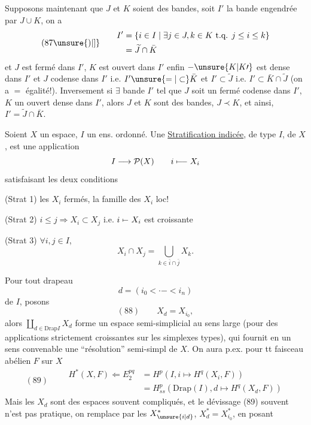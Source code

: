 Supposons maintenant que $J$ et $K$ soient des bandes,  soit $I'$ la bande engendrée par $J\cup K$, on a
\[
(87\unsure{)|]}\qquad\begin{aligned}
I'&=\{i\in I\mid\exists j\in J,k\in K\text{ t.q. }j\leq i\leq k\}\\
&=\widetilde J\cap\bar K
\end{aligned}
\]
et $J$ est fermé dans $I'$, $K$ est ouvert dans $I'$ enfin  $-\unsure{K|K\prime}$ est dense dans $I'$ et $J$ codense dans $I'$ i.e. $I'\unsure{=|\subset}\bar K$ et $I'\subset\widetilde J$  i.e. $I'\subset\bar K\cap\widetilde J$ (on a $=$ égalité!). Inversement si $\exists$ bande $I'$ tel que $J$ soit un fermé codense dans $I'$, $K$ un ouvert dense dans $I'$, alors $J$ et $K$ sont des bandes, $J\prec K$, et ainsi, $I'=\widetilde J\cap\bar K$.


Soient $X$ un espace, $I$ un ens. ordonné.
Une \uline{Stratification indicée}, de type $I$, de $X$, est une application
\[I\longrightarrow\mathcal P(X)\qquad i\mathrel{\mapstochar\relbar\joinrel\relbar}X_i\]
satisfaisant les deux conditions

(Strat 1) les $X_i$ fermés, la famille des $X_i$  loc! 

(Strat 2) $i\leq j\Longrightarrow X_i\subset X_j$ i.e. $i\mathrel{\mapstochar\relbar}X_i$ est croissante

(Strat 3) $\forall i,j\in I$, 
\[X_i\cap X_j=\bigcup_{k\in\bar i\cap\bar j}X_k.\]

Pour tout drapeau
\[d=(i_0<\mathord{\cdot}\mathord{-}<i_n)\]
de $I$, posons
\[(88)\qquad X_d=X_{i_0},\]
alors  $\coprod_{d\in\mathrm{Drap}I}X_d$ forme un  espace semi-simplicial  au sens large (pour des applications strictement croissantes sur les simplexes types), qui fournit en un sens convenable une ``résolution'' semi-simpl de $X$. On aura p.ex. pour tt faisceau abélien $F$ sur $X$
\[
(89)\qquad\begin{aligned}
H^*(X,F)\Longleftarrow E_2^{pq}&=H^p(I,i\mapsto H^q(X_i,F))\\
&=H^p_{ss}(\mathrm{Drap}(I),d\mapsto H^q(X_d,F))
\end{aligned}
\]
Mais les  $X_d$ sont des espaces souvent compliqués, et le dévissage (89) souvent n'est pas pratique, on remplace par les $X_{\unsure{i|d}}^*$, $X_d^*=X_{i_0}^*$, en posant

